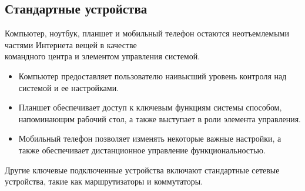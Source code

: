 \subsection{Стандартные устройства}
Компьютер, ноутбук, планшет и мобильный телефон остаются неотъемлемыми частями Интернета вещей в качестве \\командного центра и
элементом управления системой.
\begin{itemize}
    \item Компьютер предоставляет пользователю наивысший уровень контроля над системой и ее
    настройками.
    \item Планшет обеспечивает доступ к ключевым функциям системы способом, напоминающим
    рабочий стол, а также выступает в роли элемента управления.
    \item Мобильный телефон позволяет изменять некоторые важные настройки, а также обеспечивает дистанционное управление функциональностью.
\end{itemize}
Другие ключевые подключенные устройства включают стандартные сетевые устройства, такие как маршрутизаторы и коммутаторы.